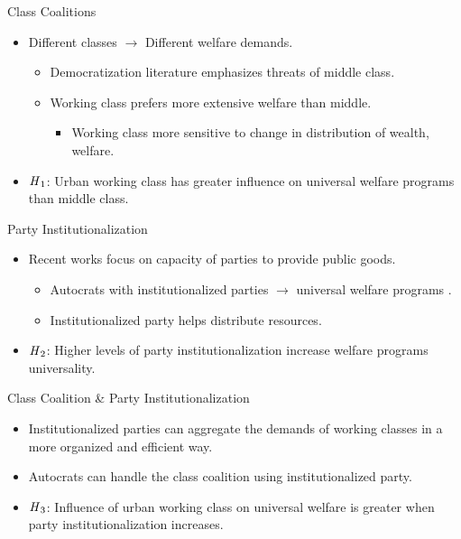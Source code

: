 \documentclass{Bredelebeamer}
\begin{document}
\begin{frame}{Class Coalitions}
\begin{itemize}
	\item Different classes $\rightarrow$ Different welfare demands.
	\begin{itemize}
		\item Democratization literature emphasizes threats of middle class.
		\item Working class prefers more extensive welfare than middle.
		\begin{itemize}
			\item Working class more sensitive to change in distribution of wealth, welfare.%
		\end{itemize}
	\end{itemize}\pause
	\item $\text{\textit{H}}_1$: Urban working class has greater influence on universal welfare programs than middle class.
\end{itemize}
\end{frame}

\begin{frame}{Party Institutionalization}
\begin{itemize}
	\item Recent works focus on capacity of parties to provide public goods.
	\begin{itemize}
		\item Autocrats with institutionalized parties $\rightarrow$ universal welfare programs \citep{Rasmussen2019}.
		\item Institutionalized party helps distribute resources.
	\end{itemize}\pause
	\item $\text{\textit{H}}_2$: Higher levels of party institutionalization increase welfare programs universality.
\end{itemize}
\end{frame}

\begin{frame}{Class Coalition \& Party Institutionalization}
	\begin{itemize}
		\item Institutionalized parties can aggregate the demands of working classes in a more organized and efficient way.
		\item Autocrats can handle the class coalition using institutionalized party.\pause
		\item $\text{\textit{H}}_3$: Influence of urban working class on universal welfare is greater when party institutionalization increases.
	\end{itemize}
\end{frame}
\end{document}

